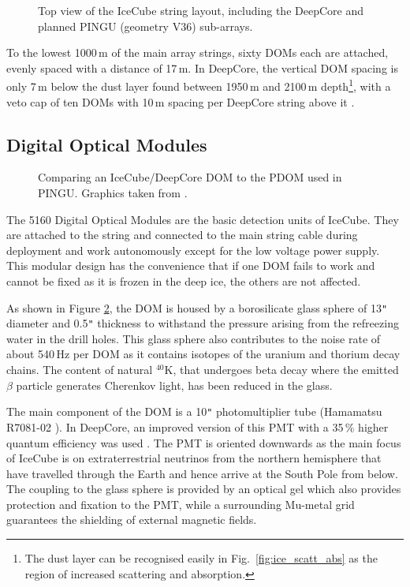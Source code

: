 \begin{figure}[htp]
 \centering
 \caption{Top view of the IceCube string layout, including the DeepCore and 
planned PINGU (geometry V36) sub-arrays.}
 \label{fig:string_layout}
\end{figure}

To the lowest 1000\,m of the main array strings, sixty DOMs each are attached, 
evenly spaced with a distance of 17\,m. In DeepCore, the vertical DOM spacing 
is only 7\,m below the dust layer found between 1950\,m and 2100\,m 
depth\footnote{The dust layer can be recognised easily in 
Fig.~\ref{fig:ice_scatt_abs} as the region of increased scattering and 
absorption.}, with a veto cap of ten DOMs with 10\,m spacing per DeepCore 
string above it \cite{I3Design,DCDesign}.


\subsection{Digital Optical Modules}
\label{sec:ICDOM}

\begin{figure}[htp]
 \centering
 
 \caption{Comparing an IceCube/DeepCore DOM to the PDOM used in PINGU. Graphics 
taken from \cite{LoI}.}
 \label{fig:DOM}
\end{figure}

The 5160 Digital Optical Modules are the basic detection units of IceCube. They 
are attached to the string and connected to the main string cable during 
deployment and work autonomously except for the low voltage power supply. This 
modular design has the convenience that if one DOM fails to work and cannot be 
fixed as it is frozen in the deep ice, the others are not affected.

As shown in Figure \ref{fig:DOM}, the DOM is housed by a borosilicate glass 
sphere of 13\verb+"+ diameter and 0.5\verb+"+ thickness to withstand the 
pressure arising from the refreezing water in the drill holes. This glass sphere 
also contributes to the noise rate of about 540\,Hz per DOM as it contains 
isotopes of the uranium and thorium decay chains. The content of natural 
$^{40}\mathrm{K}$, that undergoes beta decay where the emitted $\beta$ particle
generates Cherenkov light, has been reduced in the glass.

The main component of the DOM is a 10\verb+"+ photomultiplier tube (Hamamatsu 
R7081-02 \cite{PMTpaper,PMTdata}). In DeepCore, an improved version of this PMT 
with a 35\,\% higher quantum efficiency was used \cite{DCDesign}. The PMT is 
oriented downwards as the main focus of IceCube is on extraterrestrial neutrinos 
from the northern hemisphere that have travelled through the Earth and hence 
arrive at the South Pole from below. The coupling to the glass sphere is 
provided by an optical gel which also provides protection and fixation to the 
PMT, while a surrounding Mu-metal grid guarantees the shielding of external 
magnetic fields.

